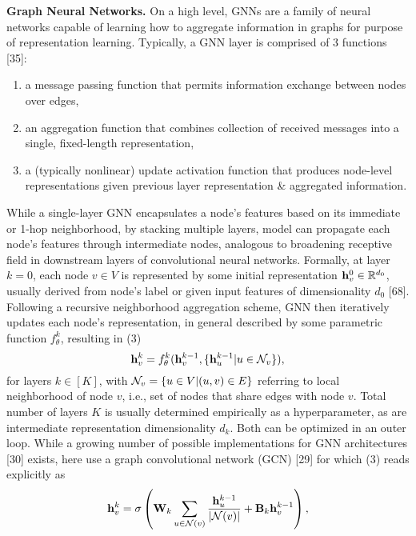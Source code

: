 \documentclass{article}
\begin{document}
\begin{itemize}
    {\bf Graph Neural Networks.} On a high level, GNNs are a family of neural networks capable of learning how to aggregate information in graphs for purpose of representation learning. Typically, a GNN layer is comprised of 3 functions [35]:
    \begin{enumerate}
        \item a message passing function that permits information exchange between nodes over edges,
        \item an aggregation function that combines collection of received messages into a single, fixed-length representation,
        \item a (typically nonlinear) update activation function that produces node-level representations given previous layer representation \& aggregated information.
    \end{enumerate}
    While a single-layer GNN encapsulates a node's features based on its immediate or 1-hop neighborhood, by stacking multiple layers, model can propagate each node's features through intermediate nodes, analogous to broadening receptive field in downstream layers of convolutional neural networks. Formally, at layer $k = 0$, each node $v\in V$ is represented by some initial representation ${\bf h}_v^0\in\mathbb{R}^{d_0}$, usually derived from node's label or given input features of dimensionality $d_0$ [68]. Following a recursive neighborhood aggregation scheme, GNN then iteratively updates each node's representation, in general described by some parametric function $f_\theta^k$, resulting in (3)
    \begin{equation*}
        {\bf h}_v^k = f_\theta^k({\bf h}_v^{k-1},\{{\bf h}_u^{k-1}|u\in{\cal N}_v\}),
    \end{equation*}
    for layers $k\in[K]$, with ${\cal N}_v = \{u\in V|(u,v)\in E\}$ referring to local neighborhood of node $v$, i.e., set of nodes that share edges with node $v$. Total number of layers $K$ is usually determined empirically as a hyperparameter, as are intermediate representation dimensionality $d_k$. Both can be optimized in an outer loop. While a growing number of possible implementations for GNN architectures [30] exists, here use a graph convolutional network (GCN) [29] for which (3) reads explicitly as
    \begin{equation*}
        {\bf h}_v^k = \sigma\left({\bf W}_k\sum_{u\in{\cal N}(v)} \frac{{\bf h}_u^{k-1}}{|{\cal N}(v)|} + {\bf B}_k{\bf h}_v^{k-1}\right),
    \end{equation*}

\end{itemize}
\end{document}
